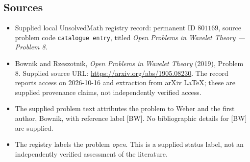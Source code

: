 \documentclass[11pt]{article}
\begin{document}
\subsection{Sources}
\begin{itemize}
\item Supplied local UnsolvedMath registry record: permanent ID \(801169\), source problem code \texttt{catalogue entry}, titled \emph{Open Problems in Wavelet Theory --- Problem 8}.
\item Bownik and Rzeszotnik, \emph{Open Problems in Wavelet Theory} (2019), Problem 8. Supplied source URL: \url{https://arxiv.org/abs/1905.08230}. The record reports access on 2026-10-16 and extraction from arXiv LaTeX; these are supplied provenance claims, not independently verified access.
\item The supplied problem text attributes the problem to Weber and the first author, Bownik, with reference label [BW]. No bibliographic details for [BW] are supplied.
\item The registry labels the problem \emph{open}. This is a supplied status label, not an independently verified assessment of the literature.
\end{itemize}
\end{document}
